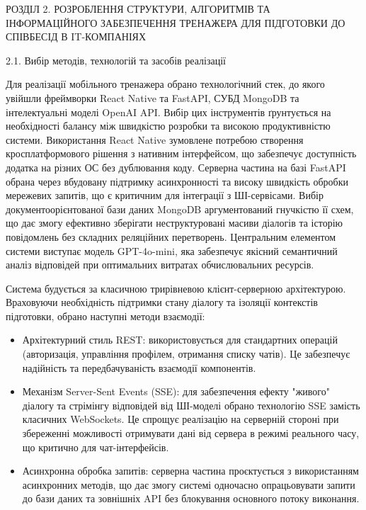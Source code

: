 \protect{}\label{_Toc228981058}{}РОЗДІЛ 2. РОЗРОБЛЕННЯ
СТРУКТУРИ, АЛГОРИТМІВ ТА ІНФОРМАЦІЙНОГО ЗАБЕЗПЕЧЕННЯ ТРЕНАЖЕРА ДЛЯ
ПІДГОТОВКИ ДО СПІВБЕСІД В IT-КОМПАНІЯХ

\protect{}\label{_Toc228981059}{}2.1. Вибір методів,
технологій та засобів реалізації

Для реалізації мобільного тренажера обрано технологічний стек, до якого
увійшли фреймворки React Native та FastAPI, СУБД MongoDB та
інтелектуальні моделі OpenAI API. Вибір цих інструментів ґрунтується на
необхідності балансу між швидкістю розробки та високою продуктивністю
системи. Використання React Native зумовлене потребою створення
кросплатформового рішення з нативним інтерфейсом, що забезпечує
доступність додатка на різних ОС без дублювання коду. Серверна частина
на базі FastAPI обрана через вбудовану підтримку асинхронності та високу
швидкість обробки мережевих запитів, що є критичним для інтеграції з
ШІ-сервісами. Вибір документоорієнтованої бази даних MongoDB
аргументований гнучкістю її схем, що дає змогу ефективно зберігати
неструктуровані масиви діалогів та історію повідомлень без складних
реляційних перетворень. Центральним елементом системи виступає модель
GPT-4o-mini, яка забезпечує якісний семантичний аналіз відповідей при
оптимальних витратах обчислювальних ресурсів.

Система будується за класичною трирівневою клієнт-серверною
архітектурою. Враховуючи необхідність підтримки стану діалогу та
ізоляції контекстів підготовки, обрано наступні методи взаємодії:

\begin{itemize}
\item
  Архітектурний стиль REST: використовується для стандартних операцій
  (авторизація, управління профілем, отримання списку чатів). Це
  забезпечує надійність та передбачуваність взаємодії компонентів.
\item
  Механізм Server-Sent Events (SSE): для забезпечення ефекту "живого"
  діалогу та стрімінгу відповідей від ШІ-моделі обрано технологію SSE
  замість класичних WebSockets. Це спрощує реалізацію на серверній
  стороні при збереженні можливості отримувати дані від сервера в режимі
  реального часу, що критично для чат-інтерфейсів.
\item
  Асинхронна обробка запитів: серверна частина проєктується з
  використанням асинхронних методів, що дає змогу системі одночасно
  опрацьовувати запити до бази даних та зовнішніх API без блокування
  основного потоку виконання.
\end{itemize}

